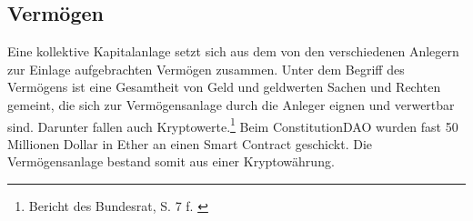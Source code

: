 \documentclass[a4paper,12pt]{report}
\begin{document}
	\subsection{Vermögen}
	\startsubsection
	Eine kollektive Kapitalanlage setzt sich aus dem von den verschiedenen Anlegern zur Einlage aufgebrachten Vermögen zusammen. Unter dem Begriff des Vermögens ist eine Gesamtheit von Geld und geldwerten Sachen und Rechten gemeint, die sich zur Vermögensanlage durch die Anleger eignen und verwertbar sind.
	 Darunter fallen auch Kryptowerte.\footnote{\hspace{0.5em}Bericht des Bundesrat, S. 7 f. \citeauthor{BBR}} Beim ConstitutionDAO wurden fast 50 Millionen Dollar in Ether an einen Smart Contract geschickt. Die Vermögensanlage bestand somit aus einer Kryptowährung.
	\closesection
\end{document}
